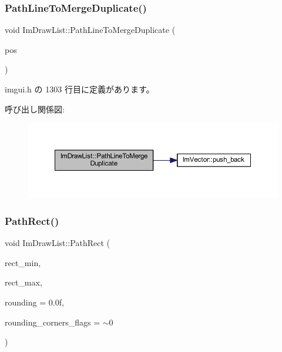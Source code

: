 \subsubsection{\texorpdfstring{Path\+Line\+To\+Merge\+Duplicate()}{PathLineToMergeDuplicate()}}
{\footnotesize\ttfamily void Im\+Draw\+List\+::\+Path\+Line\+To\+Merge\+Duplicate (\begin{DoxyParamCaption}\item[{const \mbox{\hyperlink{struct_im_vec2}{Im\+Vec2}} \&}]{pos }\end{DoxyParamCaption})\hspace{0.3cm}{\ttfamily [inline]}}



 imgui.\+h の 1303 行目に定義があります。

呼び出し関係図\+:\nopagebreak
\begin{figure}[H]
\begin{center}
\leavevmode
\includegraphics[width=350pt]{struct_im_draw_list_aa3dd11945fb62495f8b9e1392ed724e3_cgraph}
\end{center}
\end{figure}
\mbox{\label{struct_im_draw_list_a1b63e7c7bbb70f8a7be2b227a3d3f802}} 
\subsubsection{\texorpdfstring{Path\+Rect()}{PathRect()}}
{\footnotesize\ttfamily void Im\+Draw\+List\+::\+Path\+Rect (\begin{DoxyParamCaption}\item[{const \mbox{\hyperlink{struct_im_vec2}{Im\+Vec2}} \&}]{rect\+\_\+min,  }\item[{const \mbox{\hyperlink{struct_im_vec2}{Im\+Vec2}} \&}]{rect\+\_\+max,  }\item[{float}]{rounding = {\ttfamily 0.0f},  }\item[{int}]{rounding\+\_\+corners\+\_\+flags = {\ttfamily $\sim$0} }\end{DoxyParamCaption})}



